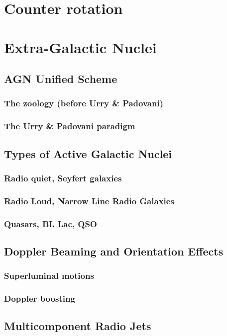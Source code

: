\documentclass[10pt,a4paper,english,draft]{article}
\begin{document}
\section{Counter rotation}
\label{sec:counter_rotation}



\section{Extra-Galactic Nuclei}
\subsection{AGN Unified Scheme}
\subsubsection{The zoology (before Urry \& Padovani)}
\subsubsection{The Urry \& Padovani paradigm}
\subsection{Types of Active Galactic Nuclei}
\subsubsection{Radio quiet, Seyfert galaxies}
\subsubsection{Radio Loud, Narrow Line Radio Galaxies}
\subsubsection{Quasars, BL Lac, QSO}
\subsection{Doppler Beaming and Orientation Effects}
\subsubsection{Superluminal motions}
\subsubsection{Doppler boosting}
\subsection{Multicomponent Radio Jets}
\end{document}
